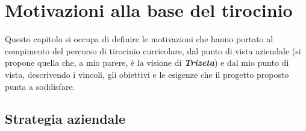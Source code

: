 
\chapter{Motivazioni alla base del tirocinio}
\label{cap:motivazioni-tirocinio}
Questo capitolo si occupa di definire le motivazioni che hanno portato al compimento del percorso di tirocinio curricolare, dal punto di vista aziendale (si propone quella che, a mio parere, è la visione di \textit{\textbf{Trizeta}}) e dal mio punto di vista,
descrivendo i vincoli, gli obiettivi e le esigenze che il progetto proposto punta a soddisfare.

\section{Strategia aziendale}


